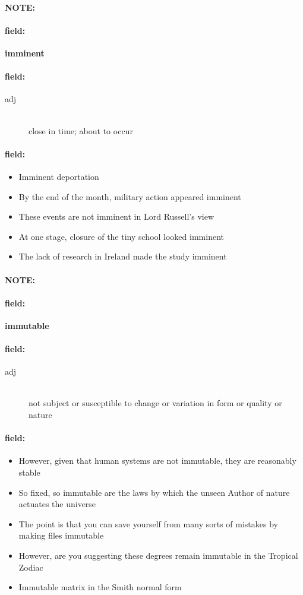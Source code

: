\documentclass[12pt]{article}
\newenvironment{note}{\paragraph{NOTE:}}{}
\newenvironment{field}{\paragraph{field:}}{}
\begin{document}
\begin{note}
\begin{field}
\textbf{\large imminent}
\end{field}


\begin{field}
\begin{description}
\item[adj] \hfill \\ 
close in time; about to occur

\end{description}
\end{field}

\begin{field}
\begin{itemize}
\item Imminent deportation
\item By the end of the month, military action appeared imminent
\item These events are not imminent in Lord Russell's view
\item At one stage, closure of the tiny school looked imminent
\item The lack of research in Ireland made the study imminent
\end{itemize}
\end{field}
\end{note}
\begin{note}
\begin{field}
\textbf{\large immutable}
\end{field}


\begin{field}
\begin{description}
\item[adj] \hfill \\ 
not subject or susceptible to change or variation in form or quality or nature

\end{description}
\end{field}

\begin{field}
\begin{itemize}
\item However, given that human systems are not immutable, they are reasonably stable
\item So fixed, so immutable are the laws by which the unseen Author of nature actuates the universe
\item The point is that you can save yourself from many sorts of mistakes by making files immutable
\item However, are you suggesting these degrees remain immutable in the Tropical Zodiac
\item Immutable matrix in the Smith normal form
\end{itemize}
\end{field}
\end{note}
\end{document}

